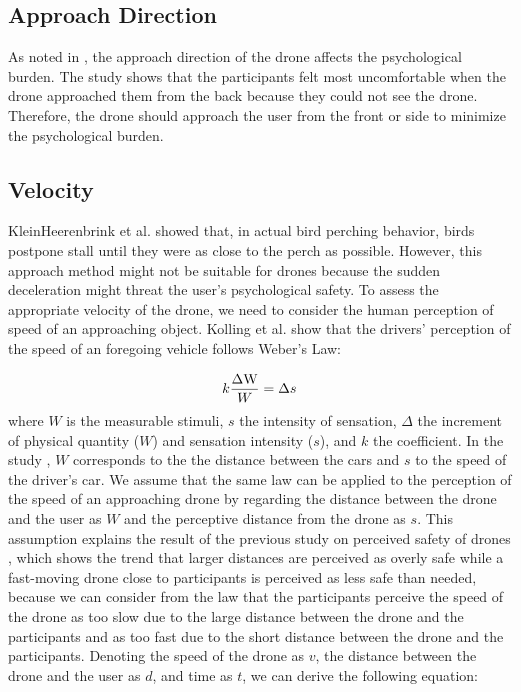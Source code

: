 \subsection{Approach Direction}

As noted in \cite{lieser2021evaluating-distances}, the approach direction of the drone affects the psychological burden.
The study shows that the participants felt most uncomfortable when the drone approached them from the back because they could not see the drone.
Therefore, the drone should approach the user from the front or side to minimize the psychological burden.


\subsection{Velocity}

KleinHeerenbrink et al. \cite{kleinheerenbrink2022optimization} showed that, in actual bird perching behavior, birds postpone stall until they were as close to the perch as possible.
However, this approach method might not be suitable for drones because the sudden deceleration might threat the user's psychological safety.
To assess the appropriate velocity of the drone, we need to consider the human perception of speed of an approaching object.
Kolling et al. \cite{Kolling2012weber-fechner-law} show that the drivers' perception of the speed of an foregoing vehicle follows Weber's Law:

\begin{equation}
    k{\frac{\Delta {\rm W}}{W}}=\Delta s
    \label{eq:weber-law}
\end{equation}
where $W$ is the measurable stimuli, $s$ the intensity of sensation, $\Delta$ the increment of physical quantity ($W$) and sensation intensity ($s$), and $k$ the coefficient. 
In the study \cite{Kolling2012weber-fechner-law}, $W$ corresponds to the the distance between the cars and $s$ to the speed of the driver's car.
We assume that the same law can be applied to the perception of the speed of an approaching drone by regarding the distance between the drone and the user as $W$ and the perceptive distance from the drone as $s$.
This assumption explains the result of the previous study on perceived safety of drones \cite{van2023perceived-safety}, 
which shows the trend that larger distances are perceived as overly safe while a fast-moving drone close to participants is perceived as less safe than needed,
because we can consider from the law that the participants perceive the speed of the drone as too slow due to the large distance between the drone and the participants and as too fast due to the short distance between the drone and the participants.
Denoting the speed of the drone as $v$, the distance between the drone and the user as $d$, and time as $t$, we can derive the following equation:

